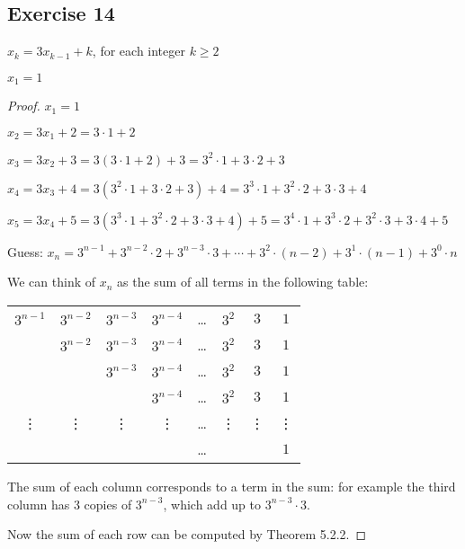 \documentclass[14pt]{extarticle}
\begin{document}
    \subsection{Exercise 14}
    \(x_k = 3x_{k-1} + k\), for each integer \(k \geq 2\)

    \(x_1 = 1\)

    \begin{proof}
        \(x_1 = 1\)

        \(x_2 = 3x_1 + 2 = 3 \cdot 1 + 2\)

        \(x_3 = 3x_2 + 3 = 3(3 \cdot 1 + 2) + 3 = 3^2 \cdot 1 + 3 \cdot 2 + 3\)

        \(x_4 = 3x_3 + 4 = 3(3^2 \cdot 1 + 3 \cdot 2 + 3) + 4 = 3^3 \cdot 1 + 3^2 \cdot 2 + 3 \cdot 3 + 4\)

        \(x_5 = 3x_4 + 5 = 3(3^3 \cdot 1 + 3^2 \cdot 2 + 3 \cdot 3 + 4) + 5 = 3^4 \cdot 1 + 3^3 \cdot 2 + 3^2 \cdot 3 + 3 \cdot 4 + 5\)

        Guess: \(x_n = 3^{n-1} + 3^{n-2} \cdot 2 + 3^{n-3} \cdot 3 + \cdots + 3^2 \cdot (n-2) + 3^1 \cdot (n-1) + 3^0 \cdot n\)

        We can think of $x_n$ as the sum of all terms in the following table:
        \begin{center}
            \begin{tabular}{cccccccc}
                \(3^{n-1}\) & \(3^{n-2}\) & \(3^{n-3}\) & \(3^{n-4}\) & \ldots & \(3^2\) & \(3\)  & \(1\)  \\
                            & \(3^{n-2}\) & \(3^{n-3}\) & \(3^{n-4}\) & \ldots & \(3^2\) & \(3\)  & \(1\)  \\
                            &             & \(3^{n-3}\) & \(3^{n-4}\) & \ldots & \(3^2\) & \(3\)  & \(1\)  \\
                            &             &             & \(3^{n-4}\) & \ldots & \(3^2\) & \(3\)  & \(1\)  \\
                \vdots      & \vdots      & \vdots      & \vdots      & \ldots & \vdots  & \vdots & \vdots \\
                            &             &             &             & \ldots &         &        & \(1\)
            \end{tabular}
        \end{center}
        The sum of each column corresponds to a term in the sum: for example the third column has 3 copies of \(3^{n-3}\),
        which add up to \(3^{n-3} \cdot 3\).

        Now the sum of each row can be computed by Theorem 5.2.2.


\end{proof}
\end{document}
